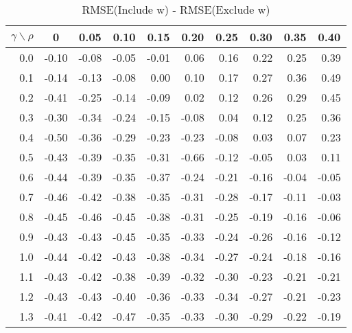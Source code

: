 \documentclass[12pt]{article}
\begin{document}
%
\begin{table}[!tbp]
\caption{RMSE(Include w) - RMSE(Exclude w)}
 \begin{center}
 \begin{tabular}{r|rrrrrrrrr}\hline\hline
\multicolumn{1}{c|}{$\gamma\backslash\rho$}&\multicolumn{1}{c}{0}&\multicolumn{1}{c}{0.05}&\multicolumn{1}{c}{0.10}&\multicolumn{1}{c}{0.15}&\multicolumn{1}{c}{0.20}&\multicolumn{1}{c}{0.25}&\multicolumn{1}{c}{0.30}&\multicolumn{1}{c}{0.35}&\multicolumn{1}{c}{0.40}\tabularnewline
\hline
0.0&-0.10&-0.08&-0.05&-0.01& 0.06& 0.16& 0.22& 0.25& 0.39\tabularnewline
0.1&-0.14&-0.13&-0.08& 0.00& 0.10& 0.17& 0.27& 0.36& 0.49\tabularnewline
0.2&-0.41&-0.25&-0.14&-0.09& 0.02& 0.12& 0.26& 0.29& 0.45\tabularnewline
0.3&-0.30&-0.34&-0.24&-0.15&-0.08& 0.04& 0.12& 0.25& 0.36\tabularnewline
0.4&-0.50&-0.36&-0.29&-0.23&-0.23&-0.08& 0.03& 0.07& 0.23\tabularnewline
0.5&-0.43&-0.39&-0.35&-0.31&-0.66&-0.12&-0.05& 0.03& 0.11\tabularnewline
0.6&-0.44&-0.39&-0.35&-0.37&-0.24&-0.21&-0.16&-0.04&-0.05\tabularnewline
0.7&-0.46&-0.42&-0.38&-0.35&-0.31&-0.28&-0.17&-0.11&-0.03\tabularnewline
0.8&-0.45&-0.46&-0.45&-0.38&-0.31&-0.25&-0.19&-0.16&-0.06\tabularnewline
0.9&-0.43&-0.43&-0.45&-0.35&-0.33&-0.24&-0.26&-0.16&-0.12\tabularnewline
1.0&-0.44&-0.42&-0.43&-0.38&-0.34&-0.27&-0.24&-0.18&-0.16\tabularnewline
1.1&-0.43&-0.42&-0.38&-0.39&-0.32&-0.30&-0.23&-0.21&-0.21\tabularnewline
1.2&-0.43&-0.43&-0.40&-0.36&-0.33&-0.34&-0.27&-0.21&-0.23\tabularnewline
1.3&-0.41&-0.42&-0.47&-0.35&-0.33&-0.30&-0.29&-0.22&-0.19\tabularnewline
\hline
\end{tabular}

\end{center}

\end{table}
\end{document}
